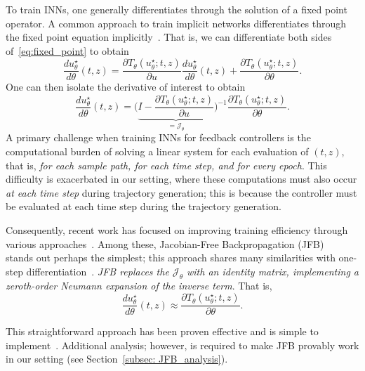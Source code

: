 \documentclass[letterpaper, 10 pt, conference]{ieeeconf}  %
\begin{document}
    To train INNs, one generally differentiates through the solution of a fixed point operator. 
    A common approach to train implicit networks differentiates through the fixed point equation implicitly~\cite{he2016deep, el2021implicit}. That is, we can differentiate both sides of~\eqref{eq:fixed_point} to obtain 
    \begin{equation*}
        \frac{du_\theta^\star}{d\theta}(t,z) = \frac{\partial T_\theta(u_\theta^\star; t,z)}{\partial u} \frac{d u_\theta^\star}{d\theta}(t,z) + \frac{\partial T_\theta(u_\theta^\star; t,z)}{\partial \theta}.        
    \end{equation*}
    One can then isolate the derivative of interest to obtain 
    \begin{equation}
        \frac{du_\theta^\star}{d\theta}(t,z) = \Bigg( \underbrace{I - \frac{\partial T_\theta(u_\theta^\star; t,z)}{\partial u}}_{= \mathcal{J}_\theta}\Bigg)^{-1} \frac{\partial T_\theta(u_\theta^\star; t,z)}{\partial \theta}.
        \label{eq:implicit_gradient}
    \end{equation}
    A primary challenge when training INNs for feedback controllers is the computational burden of solving a linear system for each evaluation of $(t,z)$, that is, \emph{for each sample path, for each time step, and for every epoch}. This difficulty is exacerbated in our setting, where these computations must also occur \emph{at each time step} during trajectory generation; this is because the controller must be evaluated at each time step during the trajectory generation.
    
    Consequently, recent work has focused on improving training efficiency through various approaches~\cite{bai2019deep, el2021implicit, fung2022jfb, bolte2024one}. Among these, Jacobian-Free Backpropagation (JFB)~\cite{fung2022jfb} stands out perhaps the simplest; this approach shares many similarities with one-step differentiation~\cite{bolte2024one}. \emph{JFB replaces the $\mathcal{J}_\theta$ with an identity matrix, implementing a zeroth-order Neumann expansion of the inverse term}. That is, 
    \begin{equation}
        \frac{du_\theta^\star}{d\theta}(t,z) \approx \frac{\partial T_\theta(u_\theta^\star; t,z)}{\partial \theta}.
        \label{eq: jfb_gradient}
    \end{equation}
    
    This straightforward approach has been proven effective and is simple to implement~\cite[Figure 3]{fung2022jfb}. 
    Additional analysis; however, is required to make JFB provably work in our setting (see Section~\ref{subsec: JFB_analysis}).
    
\end{document}

